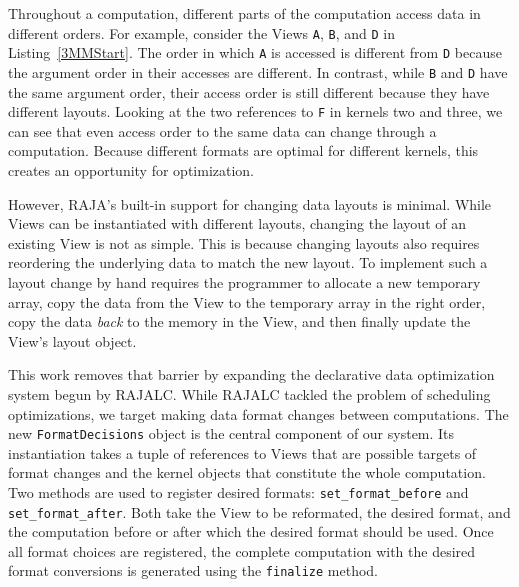 \documentclass[sigconf]{acmart}
\begin{document}
Throughout a computation, different parts of the computation access data in different orders.
For example, consider the Views \verb.A., \verb.B., and \verb.D. in Listing~\ref{3MMStart}. 
The order in which \verb.A. is accessed is different from \verb.D. because the argument order in their accesses are different.
In contrast, while \verb.B. and \verb.D. have the same argument order, their access order is still different because they have different layouts.
Looking at the two references to \verb.F. in kernels two and three, we can see that even access order to the same data can change through a computation.
Because different formats are optimal for different kernels, this creates an opportunity for optimization. 

However, RAJA's built-in support for changing data layouts is minimal. 
While Views can be instantiated with different layouts, changing the layout of an existing View is not as simple.
This is because changing layouts also requires reordering the underlying data to match the new layout. 
To implement such a layout change by hand requires the programmer to allocate a new temporary array, 
copy the data from the View to the temporary array in the right order, 
copy the data \textit{back} to the memory in the View, 
and then finally update the View's layout object.

This work removes that barrier by expanding the declarative data optimization system begun by RAJALC.
While RAJALC tackled the problem of scheduling optimizations, we target making data format changes between computations. 
The new \verb.FormatDecisions. object is the central component of our system. 
Its instantiation takes a tuple of references to Views that are possible targets of format changes and the kernel objects that constitute the whole computation.
Two methods are used to register desired formats: \verb.set_format_before. and \verb.set_format_after..
Both take the View to be reformated, the desired format, and the computation before or after which the desired format should be used.
Once all format choices are registered, the complete computation with the desired format conversions is generated using the \verb.finalize. method.
\end{document}

